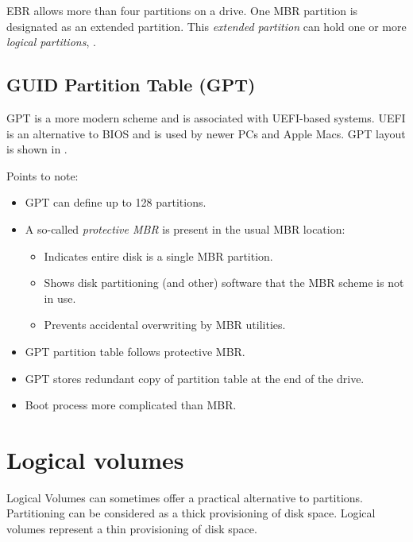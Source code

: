 EBR allows more than four partitions on a drive. One MBR partition is
designated as an extended partition. This \emph{extended partition} can
hold one or more \emph{logical partitions}, .


\subsection{GUID Partition Table (GPT)}
\label{sec:guid-partition-table}

GPT is a more modern scheme and is associated with UEFI-based systems.
UEFI is an alternative to BIOS and is used by newer PCs and Apple Macs.
GPT layout is shown in .


Points to note:

\begin{itemize}
\item
  GPT can define up to 128 partitions.
\item
  A so-called \emph{protective MBR} is present in the usual MBR
  location:

  \begin{itemize}
  \item
    Indicates entire disk is a single MBR partition.
  \item
    Shows disk partitioning (and other) software that the MBR scheme is
    not in use.
  \item
    Prevents accidental overwriting by MBR utilities.
  \end{itemize}
\item
  GPT partition table follows protective MBR.
\item
  GPT stores redundant copy of partition table at the end of the drive.
\item
  Boot process more complicated than MBR.
\end{itemize}

\section{Logical volumes}
\label{sec:logical-volumes}

Logical Volumes can sometimes offer a practical alternative to
partitions. Partitioning can be considered as a thick provisioning of
disk space. Logical volumes represent a thin provisioning of disk space.

